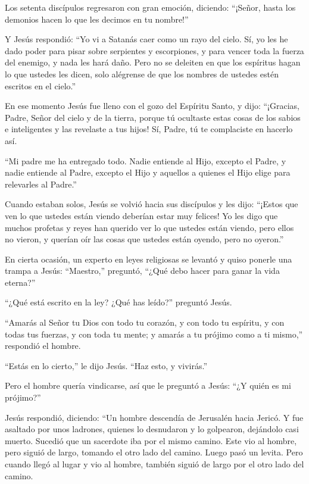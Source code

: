  Los setenta discípulos regresaron con gran emoción,
diciendo: ``¡Señor, hasta los demonios hacen lo que les decimos en tu
nombre!''

 Y Jesús respondió: ``Yo vi a Satanás caer como un rayo del
cielo.  Sí, yo les he dado poder para pisar sobre
serpientes y escorpiones, y para vencer toda la fuerza del enemigo, y
nada les hará daño.  Pero no se deleiten en que los
espíritus hagan lo que ustedes les dicen, solo alégrense de que los
nombres de ustedes estén escritos en el cielo.''

 En ese momento Jesús fue lleno con el gozo del Espíritu
Santo, y dijo: ``¡Gracias, Padre, Señor del cielo y de la tierra, porque
tú ocultaste estas cosas de los sabios e inteligentes y las revelaste a
tus hijos! Sí, Padre, tú te complaciste en hacerlo así.

 ``Mi padre me ha entregado todo. Nadie entiende al Hijo,
excepto el Padre, y nadie entiende al Padre, excepto el Hijo y aquellos
a quienes el Hijo elige para relevarles al Padre.''

 Cuando estaban solos, Jesús se volvió hacia sus discípulos
y les dijo: ``¡Estos que ven lo que ustedes están viendo deberían estar
muy felices!  Yo les digo que muchos profetas y reyes han
querido ver lo que ustedes están viendo, pero ellos no vieron, y querían
oír las cosas que ustedes están oyendo, pero no oyeron.''

 En cierta ocasión, un experto en leyes religiosas se
levantó y quiso ponerle una trampa a Jesús: ``Maestro,'' preguntó,
``¿Qué debo hacer para ganar la vida eterna?''

 ``¿Qué está escrito en la ley? ¿Qué has leído?'' preguntó
Jesús.

 ``Amarás al Señor tu Dios con todo tu corazón, y con todo
tu espíritu, y con todas tus fuerzas, y con toda tu mente; y amarás a tu
prójimo como a ti mismo,'' respondió el hombre.

 ``Estás en lo cierto,'' le dijo Jesús. ``Haz esto, y
vivirás.''

 Pero el hombre quería vindicarse, así que le preguntó a
Jesús: ``¿Y quién es mi prójimo?''

 Jesús respondió, diciendo: ``Un hombre descendía de
Jerusalén hacia Jericó. Y fue asaltado por unos ladrones, quienes lo
desnudaron y lo golpearon, dejándolo casi muerto.  Sucedió
que un sacerdote iba por el mismo camino. Este vio al hombre, pero
siguió de largo, tomando el otro lado del camino.  Luego
pasó un levita. Pero cuando llegó al lugar y vio al hombre, también
siguió de largo por el otro lado del camino.

